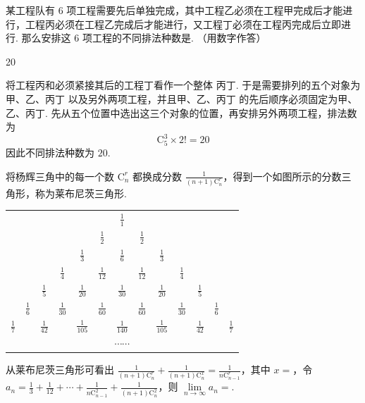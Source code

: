 \begin{problem}
某工程队有 \(6\) 项工程需要先后单独完成，其中工程乙必须在工程甲完成后才能进行，工程丙必须在工程乙完成后才能进行，又工程丁必须在工程丙完成后立即进行. 那么安排这 \(6\) 项工程的不同排法种数是\fillinblank{}. （用数字作答）
\end{problem}

\begin{answer}
20
\end{answer}

\begin{solution}
将工程丙和必须紧接其后的工程丁看作一个整体 \(\text{丙丁}\). 于是需要排列的五个对象为甲、乙、\(\text{丙丁}\) 以及另外两项工程，并且甲、乙、\(\text{丙丁}\) 的先后顺序必须固定为甲、乙、\(\text{丙丁}\). 先从五个位置中选出这三个对象的位置，再安排另外两项工程，排法数为
\[
\mathrm C_{5}^{3}\times 2!=20
\]
因此不同排法种数为 \(20\).
\end{solution}

\begin{problem}
将杨辉三角中的每一个数 \(\mathrm{C}_n^r\) 都换成分数 \(\frac{1}{(n + 1)\mathrm{C}_n^r}\)，得到一个如图所示的分数三角形，称为莱布尼茨三角形.

\begin{center}
\begin{tabular}{ccccccccccccc}
&&&&&&\(\displaystyle\frac{1}{1}\)&&&&&&\\
&&&&&\(\displaystyle\frac{1}{2}\)&&\(\displaystyle\frac{1}{2}\)&&&&&\\
&&&&\(\displaystyle\frac{1}{3}\)&&\(\displaystyle\frac{1}{6}\)&&\(\displaystyle\frac{1}{3}\)&&&&\\
&&&\(\displaystyle\frac{1}{4}\)&&\(\displaystyle\frac{1}{12}\)&&\(\displaystyle\frac{1}{12}\)&&\(\displaystyle\frac{1}{4}\)&&&\\
&&\(\displaystyle\frac{1}{5}\)&&\(\displaystyle\frac{1}{20}\)&&\(\displaystyle\frac{1}{30}\)&&\(\displaystyle\frac{1}{20}\)&&\(\displaystyle\frac{1}{5}\)&&\\
&\(\displaystyle\frac{1}{6}\)&&\(\displaystyle\frac{1}{30}\)&&\(\displaystyle\frac{1}{60}\)&&\(\displaystyle\frac{1}{60}\)&&\(\displaystyle\frac{1}{30}\)&&\(\displaystyle\frac{1}{6}\)&\\
\(\displaystyle\frac{1}{7}\)&&\(\displaystyle\frac{1}{42}\)&&\(\displaystyle\frac{1}{105}\)&&\(\displaystyle\frac{1}{140}\)&&\(\displaystyle\frac{1}{105}\)&&\(\displaystyle\frac{1}{42}\)&&\(\displaystyle\frac{1}{7}\)\\
\multicolumn{13}{c}{\(\cdots\cdots\)}
\end{tabular}
\end{center}

从莱布尼茨三角形可看出 \(\frac{1}{(n + 1)\mathrm{C}_n^{r}} + \frac{1}{(n + 1)\mathrm{C}_n^{x}} = \frac{1}{n\mathrm{C}_{n - 1}^{r}}\)，其中 \(x =\)\fillinblank{}，令 \(a_n = \frac{1}{3} + \frac{1}{12} + \cdots + \frac{1}{n\mathrm{C}_{n - 1}^{2}} + \frac{1}{(n + 1)\mathrm{C}_n^{2}}\)，则 \(\lim\limits_{n\to \infty} a_n =\)\fillinblank{}.
\end{problem}

